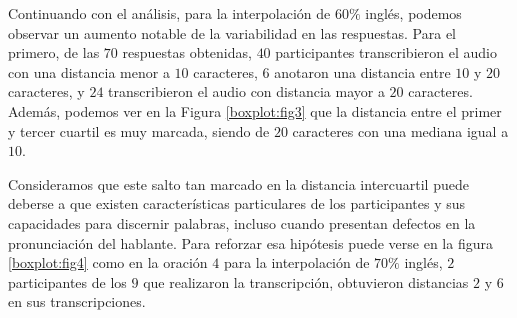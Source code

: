Continuando con el análisis, para la interpolación de $60\%$ inglés, podemos observar un aumento notable de la variabilidad en las respuestas. Para el primero, de las $70$ respuestas obtenidas, $40$ participantes transcribieron el audio con una distancia menor a $10$ caracteres, $6$ anotaron una distancia entre $10$ y $20$ caracteres, y $24$ transcribieron el audio con distancia mayor a $20$ caracteres. Además, podemos ver en la Figura \ref{boxplot:fig3} que la distancia entre el primer y tercer cuartil es muy marcada, siendo de $20$ caracteres con una mediana igual a $10$.

Consideramos que este salto tan marcado en la distancia intercuartil puede deberse a que existen características particulares de los participantes y sus capacidades para discernir palabras, incluso cuando presentan defectos en la pronunciación del hablante. Para reforzar esa hipótesis puede verse en la figura \ref{boxplot:fig4} como en la oración $4$ para la interpolación de $70\%$ inglés, $2$ participantes de los $9$ que realizaron la transcripción, obtuvieron distancias $2$ y $6$ en sus transcripciones.

